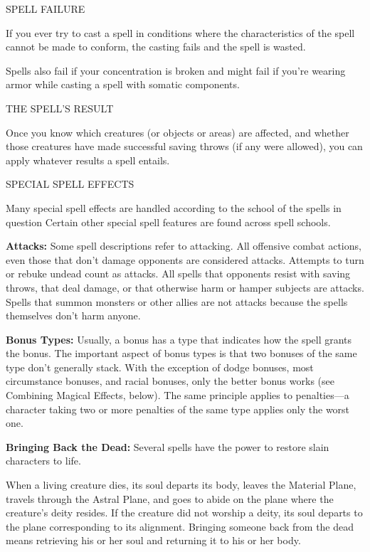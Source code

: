 \documentclass{article}
\begin{document}
\vspace{12pt}
SPELL FAILURE

If you ever try to cast a spell in conditions where the characteristics of the 
spell cannot be made to conform, the casting fails and the spell is wasted.

Spells also fail if your concentration is broken and might fail if you're wearing 
armor while casting a spell with somatic components.

\vspace{12pt}
THE SPELL'S RESULT

Once you know which creatures (or objects or areas) are affected, and whether those 
creatures have made successful saving throws (if any were allowed), you can apply 
whatever results a spell entails.

\vspace{12pt}
SPECIAL SPELL EFFECTS

Many special spell effects are handled according to the school of the spells in 
question Certain other special spell features are found across spell schools.

\textbf{Attacks:} Some spell descriptions refer to attacking. All offensive combat 
actions, even those that don't damage opponents are considered attacks. Attempts 
to turn or rebuke undead count as attacks. All spells that opponents resist with 
saving throws, that deal damage, or that otherwise harm or hamper subjects are 
attacks. Spells that summon monsters or other allies are not attacks because the 
spells themselves don't harm anyone.

\textbf{Bonus Types:} Usually, a bonus has a type that indicates how the spell 
grants the bonus. The important aspect of bonus types is that two bonuses of the 
same type don't generally stack. With the exception of dodge bonuses, most circumstance 
bonuses, and racial bonuses, only the better bonus works (see Combining Magical 
Effects, below). The same principle applies to penalties---a character taking two 
or more penalties of the same type applies only the worst one.

\textbf{Bringing Back the Dead:} Several spells have the power to restore slain 
characters to life.

When a living creature dies, its soul departs its body, leaves the Material Plane, 
travels through the Astral Plane, and goes to abide on the plane where the creature's 
deity resides. If the creature did not worship a deity, its soul departs to the 
plane corresponding to its alignment. Bringing someone back from the dead means 
retrieving his or her soul and returning it to his or her body.
\end{document}
